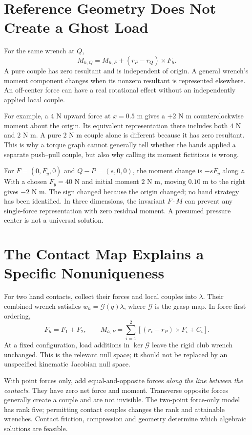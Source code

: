 \documentclass[11pt,a4paper]{article}
\begin{document}
\section{Reference Geometry Does Not Create a Ghost Load}
For the same wrench at $Q$,
\begin{equation}
M_{h,Q}=M_{h,P}+(r_P-r_Q)\times F_h.
\end{equation}
A pure couple has zero resultant and is independent of origin. A general wrench's moment component changes when its nonzero resultant is represented elsewhere. An off-center force can have a real rotational effect without an independently applied local couple.

For example, a $4$ N upward force at $x=0.5$ m gives a $+2$ N m counterclockwise moment about the origin. Its equivalent representation there includes both $4$ N and $2$ N m. A pure $2$ N m couple alone is different because it has zero resultant. This is why a torque graph cannot generally tell whether the hands applied a separate push--pull couple, but also why calling its moment fictitious is wrong.

For $F=(0,F_y,0)$ and $Q-P=(s,0,0)$, the moment change is $-sF_y$ along $z$. With a chosen $F_y=40$ N and initial moment $2$ N m, moving $0.10$ m to the right gives $-2$ N m. The sign changed because the origin changed; no hand strategy has been identified. In three dimensions, the invariant $F\cdot M$ can prevent any single-force representation with zero residual moment. A presumed pressure center is not a universal solution.

\section{The Contact Map Explains a Specific Nonuniqueness}
For two hand contacts, collect their forces and local couples into $\lambda$. Their combined wrench satisfies $w_h=\mathcal G(q)\lambda$, where $\mathcal G$ is the grasp map. In force-first ordering,
\begin{equation}
F_h=F_1+F_2,\qquad
M_{h,P}=\sum_{i=1}^2[(r_i-r_P)\times F_i+C_i].
\end{equation}
At a fixed configuration, load additions in $\ker\mathcal G$ leave the rigid club wrench unchanged. This is the relevant null space; it should not be replaced by an unspecified kinematic Jacobian null space.

With point forces only, add equal-and-opposite forces \emph{along the line between the contacts}. They have zero net force and moment. Transverse opposite forces generally create a couple and are not invisible. The two-point force-only model has rank five; permitting contact couples changes the rank and attainable wrenches. Contact friction, compression and geometry determine which algebraic solutions are feasible.
\end{document}
